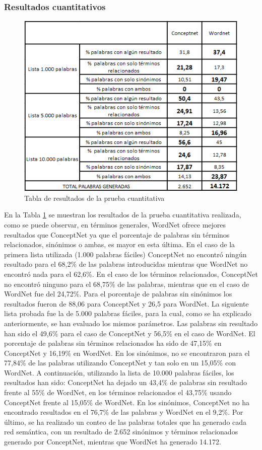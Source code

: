\subsubsection{Resultados cuantitativos}
\label{cap:subsec:pruebaCuantitativa}
\begin{figure}[!h]
\includegraphics[width=.8\textwidth]{Imagenes/Bitmap/Capitulo4/tabla_cuantitativa}
\centering
\caption{Tabla de resultados de la prueba cuantitativa}
\label{fig:tabla_cuantitativa}
\end{figure}

En la Tabla \ref{fig:tabla_cuantitativa} se muestran los resultados de la prueba cuantitativa realizada, como se puede observar, en términos generales, WordNet ofrece mejores resultados que ConceptNet ya que el porcentaje de palabras sin términos relacionados, sinónimos o ambas, es mayor en esta última. En el caso de la primera lista utilizada (1.000 palabras fáciles) ConceptNet no encontró ningún resultado para el 68,2\% de las palabras introducidas mientras que WordNet no encontró nada para el 62,6\%. En el caso de los términos relacionados, ConceptNet no encontró ninguno para el 68,75\% de las palabras, mientras que en el caso de WordNet fue del 24,72\%. Para el porcentaje de palabras sin sinónimos los resultados fueron de 88,06 para ConceptNet y 26,5 para WordNet. La siguiente lista probada fue la de 5.000 palabras fáciles, para la cual, como se ha explicado anteriormente, se han evaluado los mismos parámetros. Las palabras sin resultado han sido el 49,6\% para el caso de ConceptNet y 56,5\% en el caso de WordNet. El porcentaje de palabras sin términos relacionados ha sido de 47,15\% en ConceptNet y 16,19\% en WordNet. En los sinónimos, no se encontraron para el 77,84\% de las palabras utilizando ConceptNet  y tan solo en un 15,05\% con WordNet. A continuación, utilizando la lista de 10.000 palabras fáciles, los resultados han sido: ConceptNet ha dejado un 43,4\% de palabras sin resultado frente al 55\% de WordNet, en los términos relacionados el 43,75\% usando ConceptNet  frente al 15,05\% de WordNet. En los sinónimos, ConceptNet no ha encontrado resultados en el 76,7\% de las palabras y WordNet en el 9,2\%. Por último, se ha realizado un conteo de las palabras totales que ha generado cada red semántica, con un resultado de 2.652 sinónimos y términos relacionados generado por ConceptNet, mientras que WordNet ha generado 14.172.



